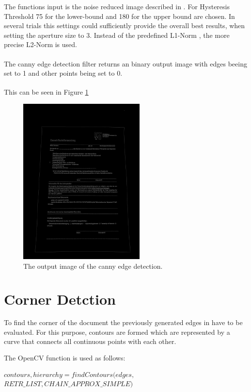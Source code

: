 \documentclass[twocolumn,10pt]{asme2ej}
\begin{document}
\noindent
The functions input is the noise reduced image described in .
For Hysteresis Threshold 75 for the lower-bound and 180 for the upper bound are chosen.
In several trials this settings could sufficiently provide the overall best results, 
when setting the aperture size to 3.
Instead of the predefined L1-Norm \cite{l1_norm}, the more precise L2-Norm\cite{l2_norm} is used.
\\\\
The canny edge detection filter returns an binary output image with edges
beeing set to 1 and other points being set to 0.
\\\\
This can be seen in Figure \ref{fig:canny}

\begin{figure}
\centerline{\includegraphics[width=2.5in]{output/hoch_3_4_canny.jpg}}
\caption{The output image of the canny edge detection.}
\label{fig:canny}
\end{figure}

\section{Corner Detction}
To find the corner of the document the previously generated edges 
in  have to be evaluated.
For this purpose, contours are formed which are represented by a curve that connects all 
continuous points with each other.\cite{SUZUKI198532}

The OpenCV function\cite{opencv_findcontours} is used as follows:
\begin{center}
    \noindent
    $contours, hierarchy = findContours(edges,$\\
    $RETR\_LIST, CHAIN\_APPROX\_SIMPLE)$
\end{center}
\end{document}
